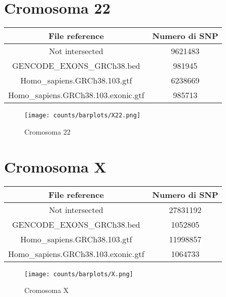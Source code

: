 \section*{Cromosoma 22}
  \begin{table}[H]\centering
	\begin{tabular}{|c|c|}
	  \hline
	  File reference & Numero di SNP \\
		\hline
		Not intersected & 9621483 \\
	  \hline
	  GENCODE\_EXONS\_GRCh38.bed & 981945 \\
	  \hline
	  Homo\_sapiens.GRCh38.103.gtf & 6238669 \\
	  \hline
	  Homo\_sapiens.GRCh38.103.exonic.gtf & 985713 \\
	  \hline
	\end{tabular}
  \end{table}
  \begin{figure}[H]
	\texttt{[image: counts/barplots/X22.png]}
	\caption{Cromosoma 22}
	\label{fig:chr22}
  \end{figure}

\section*{Cromosoma X}
  \begin{table}[H]\centering
	\begin{tabular}{|c|c|}
	  \hline
	  File reference & Numero di SNP \\
		\hline
		Not intersected & 27831192 \\
	  \hline
	  GENCODE\_EXONS\_GRCh38.bed & 1052805 \\
	  \hline
	  Homo\_sapiens.GRCh38.103.gtf & 11998857 \\
	  \hline
	  Homo\_sapiens.GRCh38.103.exonic.gtf & 1064733 \\
	  \hline
	\end{tabular}
  \end{table}
  \begin{figure}[H]
	\texttt{[image: counts/barplots/X.png]}
	\caption{Cromosoma X}
	\label{fig:chrX}
  \end{figure}

